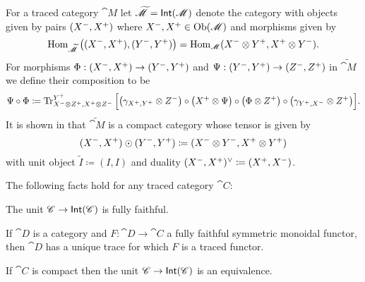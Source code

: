 \documentclass[12pt,oneside,article,draft]{memoir}
\begin{document}
For a traced category $\cat{M}$ let $\widetilde{\mathscr{M}}=\mathsf{Int}(\mathscr{M})$ denote the category with objects given by pairs $(X^-,X^+)$ where $X^-,X^+\in \operatorname{Ob}(\mathscr{M})$ and morphisms given by 
\[\operatorname{Hom}_{\widetilde{\mathscr{M}}}\big((X^-,X^+),(Y^-,Y^+)\big)=\operatorname{Hom}_{\mathscr{M}}(X^-\otimes Y^+,X^+\otimes Y^-).\]
For morphisms $\Phi:(X^-,X^+)\to(Y^-,Y^+)$ and $\Psi:(Y^-,Y^+)\to(Z^-,Z^+)$ in $\widetilde{\cat{M}}$ we define their composition to be
\[\Psi\circ\Phi\coloneqq\operatorname{Tr}^{Y^+}_{X^-\otimes Z^+,X^+\otimes Z^-}\Big[\big(\gamma_{X^+,Y^+}\otimes Z^-\big)\circ\big(X^+\otimes\Psi\big)\circ\big(\Phi\otimes Z^+\big)\circ\big(\gamma_{Y^+,X^-}\otimes Z^+\big)\Big].\]
It is shown in \cite{JoyalStreetVerity} that $\widetilde{\cat{M}}$ is a compact  category whose tensor is given by
\[(X^-,X^+)\odot(Y^-,Y^+)\coloneqq(X^-\otimes Y^-,X^+\otimes Y^+)\]
with unit object $\tilde I\coloneqq(I,I)$ and duality $(X^-,X^+)^\vee\coloneqq(X^+,X^-)$.  


%
%
%

\begin{lemma}\label{lemma:fully faithful and trace}
The following facts hold for any traced category $\cat{C}$:
\begin{compactitem}
	\item The unit $\mathscr{C}\to\mathsf{Int}(\mathscr{C})$ is fully faithful.
	\item If $\cat{D}$ is a category and $F\colon\cat{D}\to\cat{C}$ a fully faithful symmetric monoidal functor, then $\cat{D}$ has a unique trace for which $F$ is a traced functor.
	\item If $\cat{C}$ is compact then the unit $\mathscr{C}\to\mathsf{Int}(\mathscr{C})$ is an equivalence.
\end{compactitem}
\end{lemma}
\end{document}
